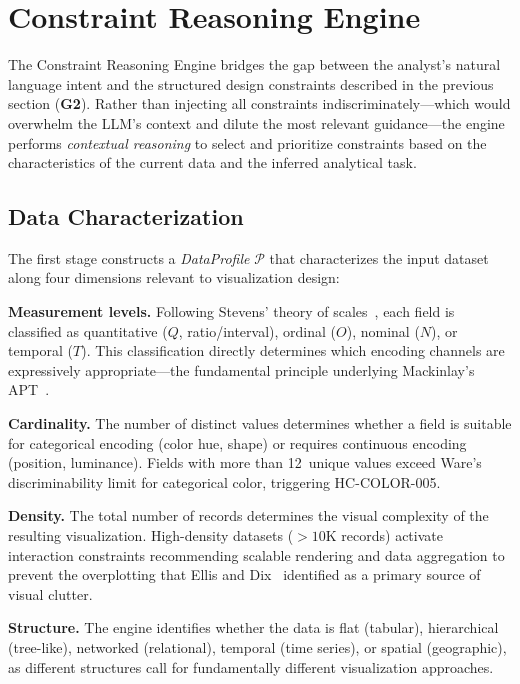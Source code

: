 \documentclass[final,5p,times,twocolumn]{elsarticle}
\begin{document}
\section{Constraint Reasoning Engine}
\label{sec:engine}

The Constraint Reasoning Engine bridges the gap between the analyst's natural language intent and the structured design constraints described in the previous section (\textbf{G2}). Rather than injecting all constraints indiscriminately---which would overwhelm the LLM's context and dilute the most relevant guidance---the engine performs \textit{contextual reasoning} to select and prioritize constraints based on the characteristics of the current data and the inferred analytical task.

\subsection{Data Characterization}

The first stage constructs a \textit{DataProfile} $\mathcal{P}$ that characterizes the input dataset along four dimensions relevant to visualization design:

\textbf{Measurement levels.} Following Stevens' theory of scales~\cite{stevens1946theory}, each field is classified as quantitative ($Q$, ratio/interval), ordinal ($O$), nominal ($N$), or temporal ($T$). This classification directly determines which encoding channels are expressively appropriate---the fundamental principle underlying Mackinlay's APT~\cite{mackinlay1986automating}.

\textbf{Cardinality.} The number of distinct values determines whether a field is suitable for categorical encoding (color hue, shape) or requires continuous encoding (position, luminance). Fields with more than 12~unique values exceed Ware's~\cite{ware2004information} discriminability limit for categorical color, triggering HC-COLOR-005.

\textbf{Density.} The total number of records determines the visual complexity of the resulting visualization. High-density datasets ($>10$K records) activate interaction constraints recommending scalable rendering and data aggregation to prevent the overplotting that Ellis and Dix~\cite{ellis2007clutter} identified as a primary source of visual clutter.

\textbf{Structure.} The engine identifies whether the data is flat (tabular), hierarchical (tree-like), networked (relational), temporal (time series), or spatial (geographic), as different structures call for fundamentally different visualization approaches.
\end{document}
